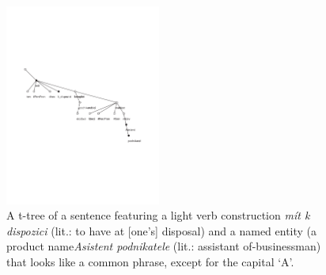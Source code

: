 \begin{figure}[htbp]
   \centerline{\includegraphics[height=2.6in]{images/as-pod.pdf}}
   \caption{A t-tree of a sentence featuring a light verb construction \emph{mít k dispozici} (lit.: to have at [one's] disposal) and a named entity (a product name\emph{Asistent podnikatele} (lit.: assistant of-businessman) that looks like a common phrase, except for the capital `A'.}
   \label{fig:asistent}
\end{figure}

